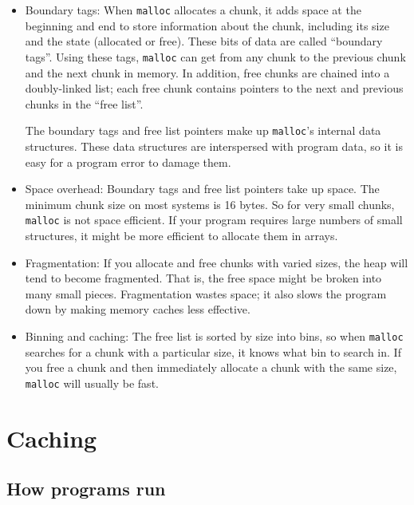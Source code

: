 \documentclass[12pt]{book}
\begin{document}
{\begin{itemize}
\item Boundary tags: When {\tt malloc} allocates a chunk, it adds
  space at the beginning and end to store information about the chunk,
  including its size and the state (allocated or free).  These bits of
  data are called ``boundary tags''.  Using these tags, {\tt malloc}
  can get from any chunk to the previous chunk and the next chunk in
  memory.  In addition, free chunks are chained into a doubly-linked
  list; each free chunk contains pointers to the next and previous
  chunks in the ``free list''.

The boundary tags and free list pointers make up {\tt malloc}'s
internal data structures.  These data structures are interspersed with
program data, so it is easy for a program error to damage them.

\item Space overhead: Boundary tags and free list pointers take up
  space.  The minimum chunk size on most systems is 16 bytes.  So for
  very small chunks, {\tt malloc} is not space efficient.  If your
  program requires large numbers of small structures, it might be more
  efficient to allocate them in arrays.

\item Fragmentation: If you allocate and free chunks with varied
  sizes, the heap will tend to become fragmented.  That is, the free
  space might be broken into many small pieces.  Fragmentation wastes
  space; it also slows the program down by making memory caches less
  effective.

\item Binning and caching: The free list is sorted by size into bins,
  so when {\tt malloc} searches for a chunk with a particular size, it
  knows what bin to search in.  If you free a chunk and then
  immediately allocate a chunk with the same size, {\tt malloc} will
  usually be fast.

\end{itemize}


\chapter{Caching}


\section{How programs run}

}
\end{document}
